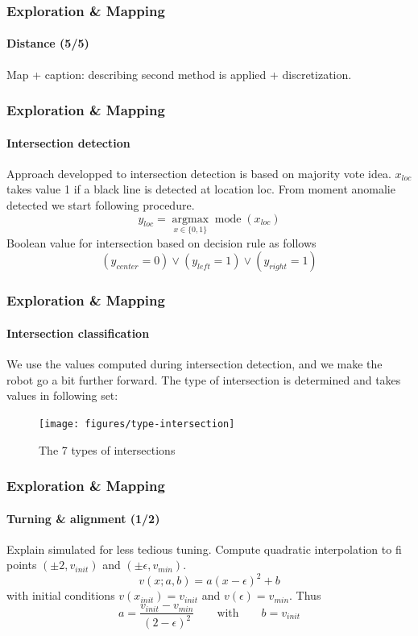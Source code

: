 \documentclass[10pt]{beamer}
\begin{document}

\begin{frame}
\frametitle{Exploration \& Mapping}
\framesubtitle{Distance (5/5)}
Map + caption: describing second method is applied + discretization.
\end{frame}


\begin{frame}
\frametitle{Exploration \& Mapping}
\framesubtitle{Intersection detection}
Approach developped to intersection detection is based on majority vote idea. $x_{loc}$ takes value 1 if a black line is detected at location loc. From moment anomalie detected we start following procedure.
$$
y_{loc} = \underset{x \in  \{0,1\}}{\operatorname{argmax}} \operatorname{mode}(x_{loc})
$$
Boolean value for intersection based on decision rule as follows
$$
(y_{center} = 0) \lor (y_{left} = 1) \lor (y_{right} = 1) 
$$
\end{frame}


\begin{frame}
\frametitle{Exploration \& Mapping}
\framesubtitle{Intersection classification}
We use the values computed during intersection detection, and we make the robot go a bit further forward. The type of intersection is determined and takes values in following set:
\begin{figure}[hbtp]
\centering
\label{fig:type-intersection}
\texttt{[image: figures/type-intersection]}
\caption{The 7 types of intersections}
\end{figure}
\end{frame}


\begin{frame}[label={frame:align}]
\frametitle{Exploration \& Mapping}
\framesubtitle{Turning \& alignment (1/2)}
Explain simulated for less tedious tuning.
Compute quadratic interpolation to fi points $(\pm2,v_{init})$ and $(\pm\epsilon,v_{min})$.
$$
v(x;a,b) = a(x-\epsilon)^2+b 
$$
with initial conditions $v(x_{init}) = v_{init}$ and $v(\epsilon) = v_{min}$. Thus
$$
a = \frac{v_{init}-v_{min}}{(2-\epsilon)^2}
\qquad\text{with}\qquad
b = v_{init}
$$
\end{frame}
\end{document}
